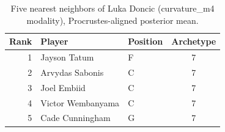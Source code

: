 \begin{table}[htbp]
  \centering\small
  \begin{tabular}{rllc}
    \toprule
    Rank & Player & Position & Archetype \\
    \midrule
    1 & Jayson Tatum & F & 7 \\
    2 & Arvydas Sabonis & C & 7 \\
    3 & Joel Embiid & C & 7 \\
    4 & Victor Wembanyama & C & 7 \\
    5 & Cade Cunningham & G & 7 \\
    \bottomrule
  \end{tabular}
  \caption{Five nearest neighbors of Luka Doncic (curvature_m4 modality), Procrustes-aligned posterior mean.}
  \label{tab:Luka_Doncic_neighbors_curvature_m4}
\end{table}

